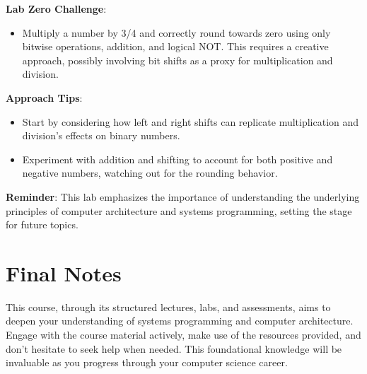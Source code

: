 \documentclass{article}
\begin{document}
\textbf{Lab Zero Challenge}:

\begin{itemize}
    \item Multiply a number by 3/4 and correctly round towards zero using only bitwise operations, addition, and logical NOT. This requires a creative approach, possibly involving bit shifts as a proxy for multiplication and division.
\end{itemize}

\textbf{Approach Tips}:

\begin{itemize}
    \item Start by considering how left and right shifts can replicate multiplication and division's effects on binary numbers.
    \item Experiment with addition and shifting to account for both positive and negative numbers, watching out for the rounding behavior.
\end{itemize}

\textbf{Reminder}: This lab emphasizes the importance of understanding the underlying principles of computer architecture and systems programming, setting the stage for future topics.

\section{Final Notes}

This course, through its structured lectures, labs, and assessments, aims to deepen your understanding of systems programming and computer architecture. Engage with the course material actively, make use of the resources provided, and don't hesitate to seek help when needed. This foundational knowledge will be invaluable as you progress through your computer science career.
\end{document}
